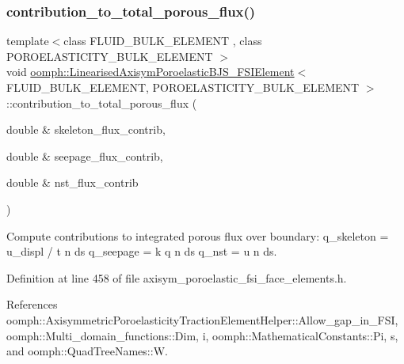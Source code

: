 \subsubsection{\texorpdfstring{contribution\+\_\+to\+\_\+total\+\_\+porous\+\_\+flux()}{contribution\_to\_total\_porous\_flux()}}
{\footnotesize\ttfamily template$<$class F\+L\+U\+I\+D\+\_\+\+B\+U\+L\+K\+\_\+\+E\+L\+E\+M\+E\+NT , class P\+O\+R\+O\+E\+L\+A\+S\+T\+I\+C\+I\+T\+Y\+\_\+\+B\+U\+L\+K\+\_\+\+E\+L\+E\+M\+E\+NT $>$ \\
void \hyperlink{classoomph_1_1LinearisedAxisymPoroelasticBJS__FSIElement}{oomph\+::\+Linearised\+Axisym\+Poroelastic\+B\+J\+S\+\_\+\+F\+S\+I\+Element}$<$ F\+L\+U\+I\+D\+\_\+\+B\+U\+L\+K\+\_\+\+E\+L\+E\+M\+E\+NT, P\+O\+R\+O\+E\+L\+A\+S\+T\+I\+C\+I\+T\+Y\+\_\+\+B\+U\+L\+K\+\_\+\+E\+L\+E\+M\+E\+NT $>$\+::contribution\+\_\+to\+\_\+total\+\_\+porous\+\_\+flux (\begin{DoxyParamCaption}\item[{double \&}]{skeleton\+\_\+flux\+\_\+contrib,  }\item[{double \&}]{seepage\+\_\+flux\+\_\+contrib,  }\item[{double \&}]{nst\+\_\+flux\+\_\+contrib }\end{DoxyParamCaption})\hspace{0.3cm}{\ttfamily [inline]}}



Compute contributions to integrated porous flux over boundary\+: q\+\_\+skeleton =   u\+\_\+displ /  t  n ds q\+\_\+seepage =  k q  n ds q\+\_\+nst =  u  n ds. 



Definition at line 458 of file axisym\+\_\+poroelastic\+\_\+fsi\+\_\+face\+\_\+elements.\+h.



References oomph\+::\+Axisymmetric\+Poroelasticity\+Traction\+Element\+Helper\+::\+Allow\+\_\+gap\+\_\+in\+\_\+\+F\+SI, oomph\+::\+Multi\+\_\+domain\+\_\+functions\+::\+Dim, i, oomph\+::\+Mathematical\+Constants\+::\+Pi, s, and oomph\+::\+Quad\+Tree\+Names\+::W.

\mbox{\label{classoomph_1_1LinearisedAxisymPoroelasticBJS__FSIElement_ade3350a09dce17dfb6443d40455fe763}} 
